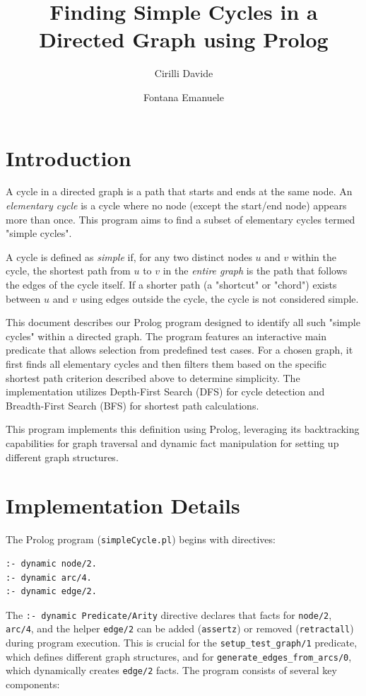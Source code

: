 \documentclass[12pt,a4paper]{article}
\title{Finding Simple Cycles in a Directed Graph using Prolog}
\author[1]{Cirilli Davide}
\author[2]{Fontana Emanuele}
\affil[1,2]{Department of Computer Science, Università degli Studi di Bari}
\begin{document}
\maketitle
\tableofcontents
\newpage
\section{Introduction}
A cycle in a directed graph is a path that starts and ends at the same node. An \textit{elementary cycle} is a cycle where no node (except the start/end node) appears more than once. This program aims to find a subset of elementary cycles termed "simple cycles".

A cycle is defined as \textit{simple} if, for any two distinct nodes 
$u$ 
 and 
$v$ 
 within the cycle, the shortest path from 
$u$ 
 to 
$v$ 
 in the \textit{entire graph} is the path that follows the edges of the cycle itself. If a shorter path (a "shortcut" or "chord") exists between 
$u$ 
 and 
$v$ 
 using edges outside the cycle, the cycle is not considered simple.

This document describes our Prolog program designed to identify all such "simple cycles" within a directed graph. The program features an interactive main predicate that allows selection from predefined test cases. For a chosen graph, it first finds all elementary cycles and then filters them based on the specific shortest path criterion described above to determine simplicity. The implementation utilizes Depth-First Search (DFS) for cycle detection and Breadth-First Search (BFS) for shortest path calculations.

This program implements this definition using Prolog, leveraging its backtracking capabilities for graph traversal and dynamic fact manipulation for setting up different graph structures.
\section{Implementation Details}
The Prolog program (\texttt{simpleCycle.pl}) begins with directives:
\begin{verbatim}
:- dynamic node/2.
:- dynamic arc/4.
:- dynamic edge/2.
\end{verbatim}
The \texttt{:- dynamic Predicate/Arity} directive declares that facts for \texttt{node/2}, \texttt{arc/4}, and the helper \texttt{edge/2} can be added (\texttt{assertz}) or removed (\texttt{retractall}) during program execution. This is crucial for the \texttt{setup\_test\_graph/1} predicate, which defines different graph structures, and for \texttt{generate\_edges\_from\_arcs/0}, which dynamically creates \texttt{edge/2} facts.
The program consists of several key components:
\end{document}
